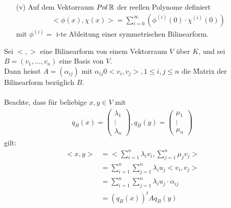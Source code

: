 \begin{itemize}
\item[(v)] Auf dem Vektorraum $Pol\, \mathbb{R}$ der reellen Polynome definiert
\begin{align}
<\phi(x), \chi(x)> = \sum_{i = 0}^{\infty} (\phi^{(i)}(0) \cdot \chi^{(i)}(0))
\end{align}
mit $\phi^{(i)} =$ i-te Ableitung einer symmetrischen Bilinearform.
\end{itemize}

Sei $<, >$ eine Bilinearform von einem Vektorraum $V$ über $K$, und sei $B = (v_1, ..., v_n)$ eine Basis von $V$. \\
Dann heisst $A = (\alpha_{ij})$ mit $\alpha_{ij} 0 <v_i, v_j>, 1 \leq i, j \leq n$ die \f{Matrix der Bilinearform} bezüglich $B$. \\\\
Beachte, dass für beliebige $x, y \in V$ mit 
\begin{align}
q_B(x) = \begin{pmatrix} \lambda_1 \\ \vdots \\ \lambda_n \end{pmatrix}, q_B(y) = \begin{pmatrix} \mu_1 \\ \vdots \\ \mu_n \end{pmatrix}
\end{align}
gilt:
\begin{align}
<x, y> &= <\sum_{i=1}^{n} \lambda_i v_i, \sum_{j=1}^{n} \mu_j v_j> \\
&= \sum_{i=1}^{n} \sum_{j=1}^{n} \lambda_i u_j <v_i, v_j> \\
&= \sum_{i=1}^{n} \sum_{j=1}^{n} \lambda_i u_j \cdot \alpha_{ij} \\
&= (q_B(x))^t A q_B(y)
\end{align}

